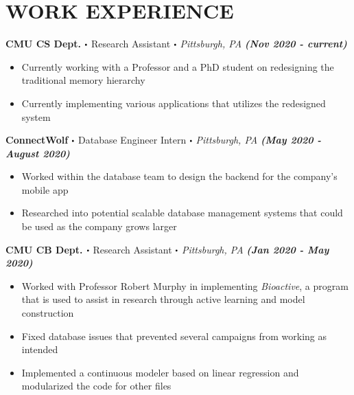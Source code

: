 \documentclass[10pt]{article}
\newcommand\sbullet[1][.5]{\mathbin{\vcenter{\hbox{\scalebox{#1}{$\bullet$}}}}}
\begin{document}
  \section*{\large \textcolor{lighterB} {WORK EXPERIENCE}}
  \vspace*{-0.23cm}
  \textbf{\large CMU CS Dept. $\sbullet$} {\large Research Assistant $\sbullet$ \textit{Pittsburgh, PA} \hfill \textit{\textbf{(Nov 2020 - current)}}}

  \vspace*{-0.2cm}
  \begin{itemize}
    \itemsep-0.4em
    \item \textcolor{lighterG}{Currently working with a Professor and a PhD student on redesigning the traditional memory hierarchy}
    \item \textcolor{lighterG}{Currently implementing various applications that utilizes the redesigned system}
  \end{itemize}

  \textbf{\large ConnectWolf $\sbullet$} {\large Database Engineer Intern $\sbullet$ \textit{Pittsburgh, PA} \hfill \textit{\textbf{(May 2020 - August 2020)}}}

  \vspace*{-0.2cm}
  \begin{itemize}
    \itemsep-0.4em
    \item \textcolor{lighterG}{Worked within the database team to design the backend for the company's mobile app}
    \item \textcolor{lighterG}{Researched into potential scalable database management systems that could be used as the company grows larger}
  \end{itemize}


  \textbf{\large CMU CB Dept. $\sbullet$} {\large Research Assistant $\sbullet$ \textit{Pittsburgh, PA} \hfill \textit{\textbf{(Jan 2020 - May 2020)}}}

  \vspace*{-0.2cm}
  \begin{itemize}
    \itemsep-0.4em
    \item \textcolor{lighterG}{Worked with Professor Robert Murphy in implementing \textit{Bioactive}, a program that is used to assist in research through active learning and model construction}
    \item \textcolor{lighterG}{Fixed database issues that prevented several campaigns from working as intended}
    \item \textcolor{lighterG}{Implemented a continuous modeler based on linear regression and modularized the code for other files}
  \end{itemize}
\end{document}
